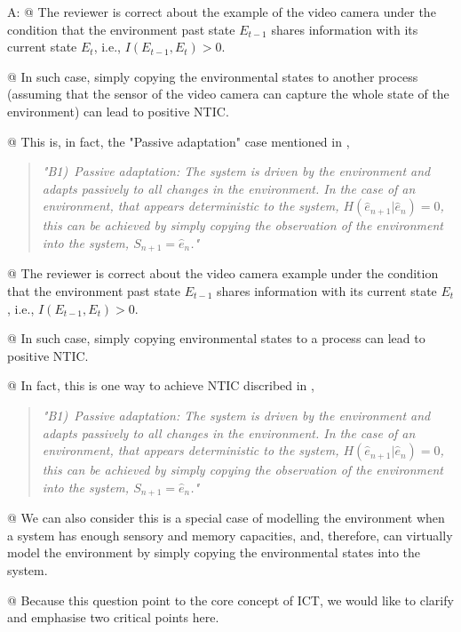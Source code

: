 \documentclass[utf8]{article}
\newenvironment{ans}  
    {\color{Black}\noindent A:}
    {~\newline}
\begin{document}
        \begin{ans}
		    @ The reviewer is correct about the example of the video camera under the condition that the environment past state $E_{t-1}$ shares information with its current state $E_t$, i.e., $I(E_{t-1}, E_t)>0$. 
		    
		    @ In such case, simply copying the environmental states to another process (assuming that the sensor of the video camera can capture the whole state of the environment) can lead to positive NTIC. 
		    
		    @ This is, in fact, the "Passive adaptation" case mentioned in \cite[p.~4]{BERTSCHINGER.2006},	
		    \begin{quote}
			      	\textit{"B1)~Passive adaptation: The system is driven by the environment and adapts passively to all changes in the environment. In the case of an environment, that appears deterministic to the system, $H(\hat{e}_{n+1} |\hat{e}_n)=0$, this can be achieved by simply copying the observation of the environment into the system, $S_{n+1} = \hat{e}_n$."}        
		    \end{quote} 
	    
	    
	    @ The reviewer is correct about the video camera example under the condition that the environment past state $E_{t-1}$ shares information with its current state $E_t$, i.e., $I(E_{t-1}, E_t)>0$. 
	    
	    @ In such case, simply copying environmental states to a process can lead to positive NTIC. 
	    
	    @ In fact, this is one way to achieve NTIC discribed in \cite[p.~4]{BERTSCHINGER.2006},    
	    \begin{quote}
	    	\textit{"B1)~Passive adaptation: The system is driven by the environment and adapts passively to all changes in the environment. In the case of an environment, that appears deterministic to the system, $H(\hat{e}_{n+1} |\hat{e}_n)=0$, this can be achieved by simply copying the observation of the environment into the system, $S_{n+1} = \hat{e}_n$."}        
	    \end{quote} 
	    
	    @ We can also consider this is a special case of modelling the environment when a system has enough sensory and memory capacities, and, therefore, can virtually model the environment by simply copying the environmental states into the system.  

	    @ Because this question point to the core concept of ICT, we would like to clarify and emphasise two critical points here. 
	    

\end{ans}
\end{document}
